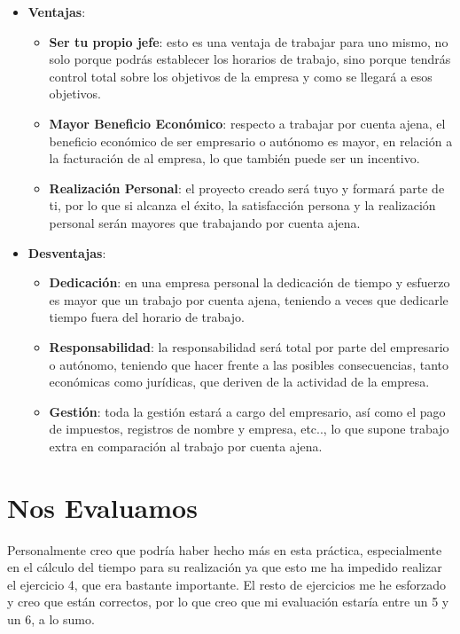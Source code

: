 \begin{itemize}
    \item \textbf{Ventajas}:
    \begin{itemize}
        \item \textbf{Ser tu propio jefe}: esto es una ventaja de trabajar para uno mismo, no solo porque podrás establecer los horarios de trabajo, sino porque tendrás control total sobre los objetivos de la empresa y como se llegará a esos objetivos.
        \item \textbf{Mayor Beneficio Económico}: respecto a trabajar por cuenta ajena, el beneficio económico de ser empresario o autónomo es mayor, en relación a la facturación de al empresa, lo que también puede ser un incentivo.
        \item \textbf{Realización Personal}: el proyecto creado será tuyo y formará parte de ti, por lo que si alcanza el éxito, la satisfacción persona y la realización personal serán mayores que trabajando por cuenta ajena.
    \end{itemize}

    \item \textbf{Desventajas}:
    \begin{itemize}
        \item \textbf{Dedicación}: en una empresa personal la dedicación de tiempo y esfuerzo es mayor que un trabajo por cuenta ajena, teniendo a veces que dedicarle tiempo fuera del horario de trabajo.
        \item \textbf{Responsabilidad}: la responsabilidad será total por parte del empresario o autónomo, teniendo que hacer frente a las posibles consecuencias, tanto económicas como jurídicas, que deriven de la actividad de la empresa.
        \item \textbf{Gestión}: toda la gestión estará a cargo del empresario, así como el pago de impuestos, registros de nombre y empresa, etc.., lo que supone trabajo extra en comparación al trabajo por cuenta ajena.
    \end{itemize}
\end{itemize}

\section{Nos Evaluamos}
Personalmente creo que podría haber hecho más en esta práctica, especialmente en el cálculo del tiempo para su realización ya que esto me ha impedido realizar el ejercicio 4, que era bastante importante. El resto de ejercicios me he esforzado y creo que están correctos, por lo que creo que mi evaluación estaría entre un 5 y un 6, a lo sumo.


%
%

